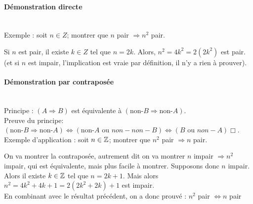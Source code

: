 {\paragraph{Démonstration directe}$ $\\
\\
Exemple : soit $n \in Z$; montrer que \og $n$ pair $\Rightarrow n^2$ pair\fg.\\
\begin{red} Si $n$ est pair, il existe $k \in Z$ tel que $n = 2k$. Alors, $n^2 = 4k^2 = 2(2k^2)$ est pair. (et si $n$ est impair, l'implication est vraie par définition, il n'y a rien à prouver).\end{red}

\paragraph{Démonstration par contraposée}$ $\\
\\
Principe : $(A\Rightarrow B)$ est équivalente à $(\text{non-}B \Rightarrow \text{non-}A)$.\\
Preuve du principe: $(\text{non-}B \Rightarrow \text{non-}A)\Leftrightarrow (\text{non-}A \text{ ou } non-non-B)\Leftrightarrow (B\text{ ou }non-A)\Box$.\\
Exemple d'application : soit $n\in \mathbb{Z}$; montrer que $n^2$ pair $\Rightarrow n$ pair.
\begin{red}
On va montrer la contraposée, autrement dit on va montrer 
\og $n$ impair $\Rightarrow n^2$ impair\fg, qui est équivalente, mais plus facile à montrer. Supposons donc $n$ impair. Alors il existe $k \in\mathbb{Z}$ tel que $n = 2k+1$. Mais alors $n^2 = 4k^2+4k+1 = 2(2k^2+2k)+1$ est impair.\\
En combinant avec le résultat précédent, on a donc prouvé : \og$n^2$ pair $\Leftrightarrow n$ pair\fg
\end{red}

}
